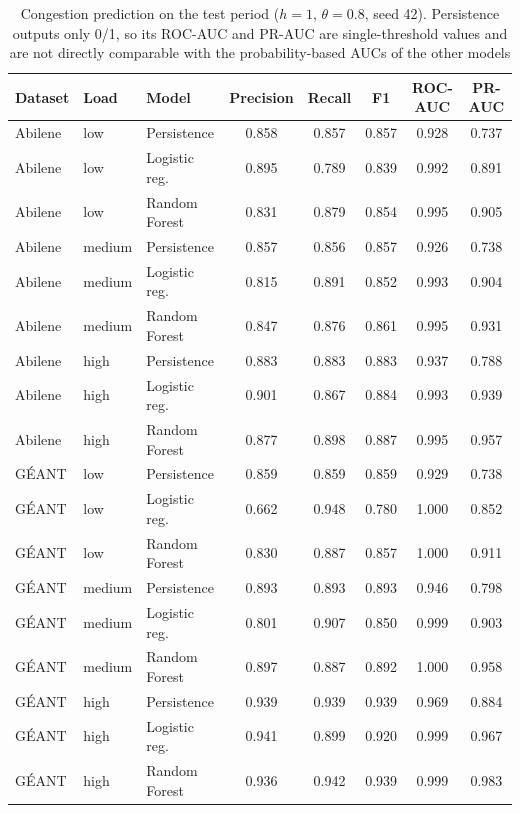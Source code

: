 \begin{table}[t]
\centering
\caption{Congestion prediction on the test period ($h=1$, $\theta=0.8$, seed 42). Persistence outputs only 0/1, so its ROC-AUC and PR-AUC are single-threshold values and are not directly comparable with the probability-based AUCs of the other models}
\label{tab:pred}
\scriptsize\setlength{\tabcolsep}{2.5pt}
\begin{tabular}{@{}lllccccc@{}}
\toprule
Dataset & Load & Model & Precision & Recall & F1 & ROC-AUC & PR-AUC \\
\midrule
Abilene & low & Persistence & 0.858 & 0.857 & 0.857 & 0.928 & 0.737 \\
Abilene & low & Logistic reg. & 0.895 & 0.789 & 0.839 & 0.992 & 0.891 \\
Abilene & low & Random Forest & 0.831 & 0.879 & 0.854 & 0.995 & 0.905 \\
Abilene & medium & Persistence & 0.857 & 0.856 & 0.857 & 0.926 & 0.738 \\
Abilene & medium & Logistic reg. & 0.815 & 0.891 & 0.852 & 0.993 & 0.904 \\
Abilene & medium & Random Forest & 0.847 & 0.876 & 0.861 & 0.995 & 0.931 \\
Abilene & high & Persistence & 0.883 & 0.883 & 0.883 & 0.937 & 0.788 \\
Abilene & high & Logistic reg. & 0.901 & 0.867 & 0.884 & 0.993 & 0.939 \\
Abilene & high & Random Forest & 0.877 & 0.898 & 0.887 & 0.995 & 0.957 \\
G\'EANT & low & Persistence & 0.859 & 0.859 & 0.859 & 0.929 & 0.738 \\
G\'EANT & low & Logistic reg. & 0.662 & 0.948 & 0.780 & 1.000 & 0.852 \\
G\'EANT & low & Random Forest & 0.830 & 0.887 & 0.857 & 1.000 & 0.911 \\
G\'EANT & medium & Persistence & 0.893 & 0.893 & 0.893 & 0.946 & 0.798 \\
G\'EANT & medium & Logistic reg. & 0.801 & 0.907 & 0.850 & 0.999 & 0.903 \\
G\'EANT & medium & Random Forest & 0.897 & 0.887 & 0.892 & 1.000 & 0.958 \\
G\'EANT & high & Persistence & 0.939 & 0.939 & 0.939 & 0.969 & 0.884 \\
G\'EANT & high & Logistic reg. & 0.941 & 0.899 & 0.920 & 0.999 & 0.967 \\
G\'EANT & high & Random Forest & 0.936 & 0.942 & 0.939 & 0.999 & 0.983 \\
\bottomrule
\end{tabular}
\end{table}
